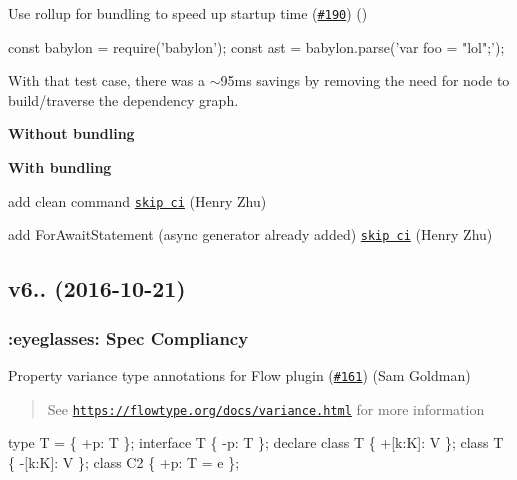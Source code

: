 \begin{DoxyItemize}
\item Use rollup for bundling to speed up startup time (\href{https://github.com/babel/babylon/pull/190}{\tt \#190}) (\href{https://github.com/DrewML}{\tt })
\end{DoxyItemize}


\begin{DoxyCode}
const babylon = require('babylon');
const ast = babylon.parse('var foo = "lol";');
\end{DoxyCode}


With that test case, there was a $\sim$95ms savings by removing the need for node to build/traverse the dependency graph.

{\bfseries Without bundling} 

{\bfseries With bundling} 


\begin{DoxyItemize}
\item add clean command \href{[#201](https://github.com/babel/babylon/pull/201)}{\tt skip ci} (Henry Zhu)
\item add For\+Await\+Statement (async generator already added) \href{[#196](https://github.com/babel/babylon/pull/196)}{\tt skip ci} (Henry Zhu)
\end{DoxyItemize}

\subsection*{v6.. (2016-\/10-\/21)}

\subsubsection*{\+:eyeglasses\+: Spec Compliancy}

Property variance type annotations for Flow plugin (\href{https://github.com/babel/babylon/pull/161}{\tt \#161}) (Sam Goldman)

\begin{quote}
See \href{https://flowtype.org/docs/variance.html}{\tt https\+://flowtype.\+org/docs/variance.\+html} for more information \end{quote}



\begin{DoxyCode}
type T = \{ +p: T \};
interface T \{ -p: T \};
declare class T \{ +[k:K]: V \};
class T \{ -[k:K]: V \};
class C2 \{ +p: T = e \};
\end{DoxyCode}


